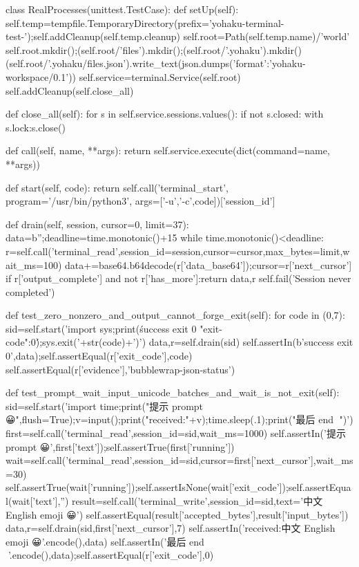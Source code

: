 class RealProcesses(unittest.TestCase):
    def setUp(self):
        self.temp=tempfile.TemporaryDirectory(prefix='yohaku-terminal-test-');self.addCleanup(self.temp.cleanup)
        self.root=Path(self.temp.name)/'world'
        self.root.mkdir();(self.root/'files').mkdir();(self.root/'.yohaku').mkdir()
        (self.root/'.yohaku/files.json').write_text(json.dumps({'format':'yohaku-workspace/0.1'}))
        self.service=terminal.Service(self.root)
        self.addCleanup(self.close_all)

    def close_all(self):
        for s in self.service.sessions.values():
            if not s.closed:
                with s.lock:s.close()

    def call(self, name, **args):
        return self.service.execute(dict(command=name, **args))

    def start(self, code):
        return self.call('terminal_start', program='/usr/bin/python3', args=['-u','-c',code])['session_id']

    def drain(self, session, cursor=0, limit=37):
        data=b'';deadline=time.monotonic()+15
        while time.monotonic()<deadline:
            r=self.call('terminal_read',session_id=session,cursor=cursor,max_bytes=limit,wait_ms=100)
            data+=base64.b64decode(r['data_base64']);cursor=r['next_cursor']
            if r['output_complete'] and not r['has_more']:return data,r
        self.fail('Session never completed')

    def test_zero_nonzero_and_output_cannot_forge_exit(self):
        for code in (0,7):
            sid=self.start('import sys;print(\'success exit 0 {"exit-code":0}\');sys.exit('+str(code)+')')
            data,r=self.drain(sid)
            self.assertIn(b'success exit 0',data);self.assertEqual(r['exit_code'],code)
            self.assertEqual(r['evidence'],'bubblewrap-json-status')

    def test_prompt_wait_input_unicode_batches_and_wait_is_not_exit(self):
        sid=self.start('import time;print("提示 prompt 😀",flush=True);v=input();print("received:"+v);time.sleep(.1);print("最后 end 🧸")')
        first=self.call('terminal_read',session_id=sid,wait_ms=1000)
        self.assertIn('提示 prompt 😀',first['text']);self.assertTrue(first['running'])
        wait=self.call('terminal_read',session_id=sid,cursor=first['next_cursor'],wait_ms=30)
        self.assertTrue(wait['running']);self.assertIsNone(wait['exit_code']);self.assertEqual(wait['text'],'')
        result=self.call('terminal_write',session_id=sid,text='中文 English emoji 😀\n')
        self.assertEqual(result['accepted_bytes'],result['input_bytes'])
        data,r=self.drain(sid,first['next_cursor'],7)
        self.assertIn('received:中文 English emoji 😀\n'.encode(),data)
        self.assertIn('最后 end 🧸\n'.encode(),data);self.assertEqual(r['exit_code'],0)

